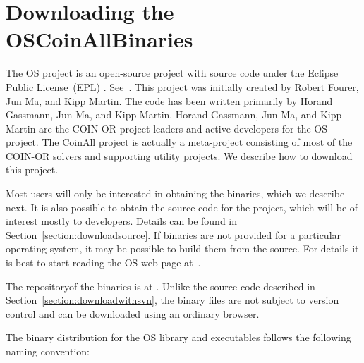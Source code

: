 \section{Downloading the \ifdevelop OS\else CoinAll\fi  Binaries}\label{section:obtainingbinaries}

\ifdevelop
The OS project is an open-source project  with source code under the Eclipse Public License~(EPL)%
.
See~{\tt\UrlEpl}.  This project was initially created by Robert Fourer, Jun Ma, and Kipp Martin.
The code has been written primarily by  Horand Gassmann,   Jun Ma,  and Kipp Martin.    
Horand Gassmann,  Jun Ma,  and Kipp Martin are the COIN-OR project leaders and active developers for the OS project.
\else
The CoinAll project is actually a meta-project consisting of most of the COIN-OR solvers and supporting utility projects.  We describe how to download this project. 
\fi

Most users will only be interested in obtaining the binaries, which we describe  next.
It is also possible to obtain the source code for the project, which will be of interest mostly to developers. 
\ifdevelop
Details can be found in  Section~\ref{section:downloadsource}.
\else
If binaries are not provided for a particular operating system, it may be possible to build them from the source.
For details it is best to start reading the OS web page at~{\tt\UrlOsWiki}.
\fi



The repositoryof the binaries is at {\tt\UrlOsBinaries}.
%
\ifdevelop
 Unlike the source code described in Section~\ref{section:downloadwithsvn}, the binary files 
are not subject to version control and can be downloaded using an ordinary browser. 
\fi

The binary distribution for the OS library and executables follows the following naming convention:



